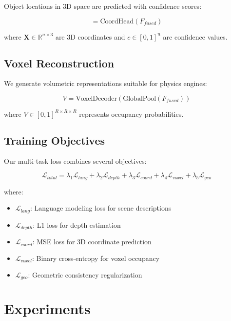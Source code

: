 \documentclass[11pt,a4paper]{article}
\begin{document}
Object locations in 3D space are predicted with confidence scores:

\begin{equation}
[\mathbf{X}, c] = \text{CoordHead}(F_{fused})
\end{equation}

where $\mathbf{X} \in \mathbb{R}^{n \times 3}$ are 3D coordinates and $c \in [0,1]^n$ are confidence values.

\subsection{Voxel Reconstruction}

We generate volumetric representations suitable for physics engines:

\begin{equation}
V = \text{VoxelDecoder}(\text{GlobalPool}(F_{fused}))
\end{equation}

where $V \in [0,1]^{R \times R \times R}$ represents occupancy probabilities.

\subsection{Training Objectives}

Our multi-task loss combines several objectives:

\begin{equation}
\mathcal{L}_{total} = \lambda_1 \mathcal{L}_{lang} + \lambda_2 \mathcal{L}_{depth} + \lambda_3 \mathcal{L}_{coord} + \lambda_4 \mathcal{L}_{voxel} + \lambda_5 \mathcal{L}_{geo}
\end{equation}

where:
\begin{itemize}
\item $\mathcal{L}_{lang}$: Language modeling loss for scene descriptions
\item $\mathcal{L}_{depth}$: L1 loss for depth estimation
\item $\mathcal{L}_{coord}$: MSE loss for 3D coordinate prediction
\item $\mathcal{L}_{voxel}$: Binary cross-entropy for voxel occupancy
\item $\mathcal{L}_{geo}$: Geometric consistency regularization
\end{itemize}

\section{Experiments}
\end{document}
